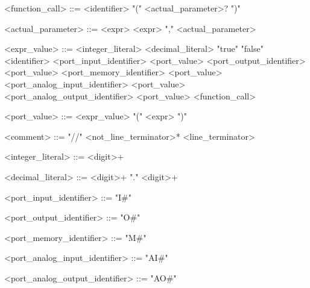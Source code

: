 \begin{grammar}
 <function\_call> ::= <identifier> "(" <actual\_parameter>? ")"
 
 <actual\_parameter> ::= <expr>
 \alt <expr> "," <actual\_parameter>
 
 <expr\_value> ::= <integer\_literal>
 \alt <decimal\_literal>
 \alt "true"
 \alt "false"
 \alt <identifier>
 \alt <port\_input\_identifier> <port\_value>
 \alt <port\_output\_identifier> <port\_value>
 \alt <port\_memory\_identifier> <port\_value>
 \alt <port\_analog\_input\_identifier> <port\_value>
 \alt <port\_analog\_output\_identifier> <port\_value>
 \alt <function\_call>
 
 <port\_value> ::= <expr\_value>
 \alt "(" <expr> ")"
 
 <comment> ::= "//" <not\_line\_terminator>* <line\_terminator>
 
 <integer\_literal> ::= <digit>+
 
 <decimal\_literal> ::= <digit>+ "." <digit>+
 
 <port\_input\_identifier> ::= "I#"
 
 <port\_output\_identifier> ::= "O#"
 
 <port\_memory\_identifier> ::= "M#"
 
 <port\_analog\_input\_identifier> ::= "AI#"
 
 <port\_analog\_output\_identifier> ::= "AO#"
 
  
\end{grammar}